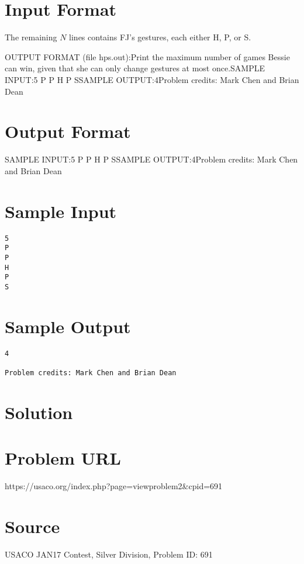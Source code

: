 \documentclass[12pt]{article}
\begin{document}
\section*{Input Format}
The remaining $N$ lines contains FJ's gestures, each either H, P, or S.

OUTPUT FORMAT (file hps.out):Print the maximum number of games Bessie can win, given that she can only
change gestures at most once.SAMPLE INPUT:5
P
P
H
P
SSAMPLE OUTPUT:4Problem credits: Mark Chen and Brian Dean

\section*{Output Format}
SAMPLE INPUT:5
P
P
H
P
SSAMPLE OUTPUT:4Problem credits: Mark Chen and Brian Dean

\section*{Sample Input}
\begin{verbatim}
5
P
P
H
P
S
\end{verbatim}

\section*{Sample Output}
\begin{verbatim}
4

Problem credits: Mark Chen and Brian Dean
\end{verbatim}

\section*{Solution}


\section*{Problem URL}
https://usaco.org/index.php?page=viewproblem2&cpid=691

\section*{Source}
USACO JAN17 Contest, Silver Division, Problem ID: 691
\end{document}
